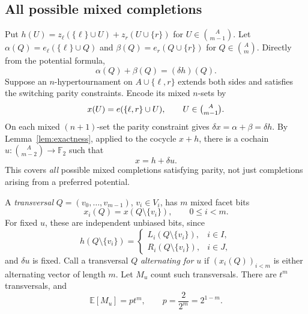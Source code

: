 \documentclass[11pt,a4paper]{article}
\theoremstyle{remark}
\newcommand{\F}{\mathbb F_2}
\begin{document}
\subsection{All possible mixed completions}
Put $h(U)=z_\ell(\{\ell\}\cup U)+z_r(U\cup\{r\})$ for
$U\in\binom A{m-1}$. Let
$\alpha(Q)=e_\ell(\{\ell\}\cup Q)$ and
$\beta(Q)=e_r(Q\cup\{r\})$ for $Q\in\binom Am$.
Directly from the potential formula,
\begin{equation}\label{eq:links}
 \alpha(Q)+\beta(Q)=(\delta h)(Q).
\end{equation}
Suppose an $n$-hypertournament on
$A\cup\{\ell,r\}$ extends both sides and satisfies the switching
parity constraints. Encode its mixed $n$-sets by
\[
 x(U)=e(\{\ell,r\}\cup U),\qquad U\in\tbinom A{m-1}.
\]
On each mixed $(n+1)$-set the parity constraint gives
$\delta x=\alpha+\beta=\delta h$.
By Lemma~\ref{lem:exactness}, applied to the cocycle $x+h$,
there is a cochain $u:\binom A{m-2}\to\F$ such that
\begin{equation}\label{eq:gauge}
 \boxed{x=h+\delta u.}
\end{equation}
This covers \emph{all} possible mixed completions satisfying parity,
not just completions arising from a preferred potential.

A \emph{transversal} $Q=(v_0,\ldots,v_{m-1})$, $v_i\in V_i$, has
$m$ mixed facet bits
\[
 x_i(Q)=x(Q\setminus\{v_i\}),\qquad 0\le i<m.
\]
For fixed $u$, these are independent unbiased bits, since
\[
 h(Q\setminus\{v_i\})=
 \begin{cases}
 L_i(Q\setminus\{v_i\}),&i\in I,\\
 R_i(Q\setminus\{v_i\}),&i\in J,
 \end{cases}
\]
and $\delta u$ is fixed.
Call a transversal $Q$ \emph{alternating for $u$} if
$(x_i(Q))_{i<m}$ is either alternating vector of length $m$.
Let $M_u$ count such transversals. There are $t^m$ transversals, and
\begin{equation}\label{eq:mean}
 \mathbb E[M_u]=p t^m,\qquad p=\frac{2}{2^m}=2^{1-m}.
\end{equation}
\end{document}
